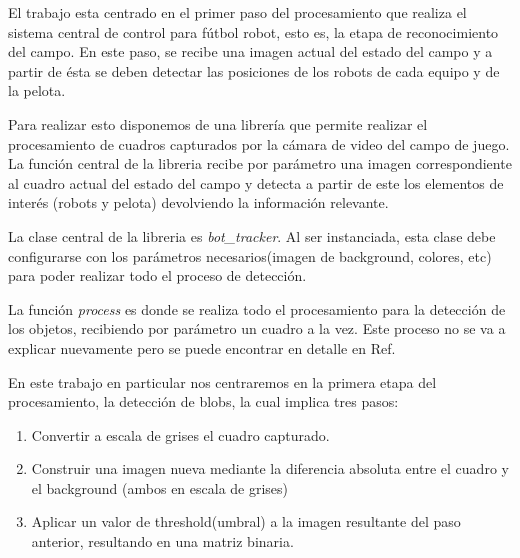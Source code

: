 \documentclass[a4paper,10pt]{report}
\begin{document}
El trabajo esta centrado en el primer paso del procesamiento que realiza el sistema central de control para fútbol robot, esto es, la etapa de reconocimiento del campo. 
En este paso, se recibe una imagen actual del estado del campo y a partir de ésta se deben detectar las posiciones de los robots de cada equipo y de la pelota.


Para realizar esto disponemos de una librería \cite{Jaureguiberry} que permite realizar el procesamiento de cuadros capturados por la cámara de video del campo de juego. 
La función central de la libreria recibe por parámetro una imagen correspondiente al cuadro actual del estado del campo y detecta a partir de este los elementos de interés 
(robots y pelota) devolviendo la información relevante. 



La clase central de la libreria es \textit{bot\_tracker}.
Al ser instanciada, esta clase debe configurarse con los parámetros necesarios(imagen de background, colores, etc) para poder realizar todo el proceso de detección.

La función \textit{process} es donde se realiza todo el procesamiento para la detección de los objetos, recibiendo por parámetro un cuadro a la vez.
Este proceso no se va a explicar nuevamente pero se puede encontrar en detalle en Ref. \cite[capitulo 5]{Jaureguiberry}

En este trabajo en particular nos centraremos en la primera etapa del procesamiento, la detección de blobs, la cual implica tres pasos:

\begin{enumerate}
 \item Convertir a escala de grises el cuadro capturado.
 \item Construir una imagen nueva mediante la diferencia absoluta entre el cuadro y el background (ambos en escala de grises)
 \item Aplicar un valor de threshold(umbral) a la imagen resultante del paso anterior, resultando en una matriz binaria. 
\end{enumerate}
\end{document}
